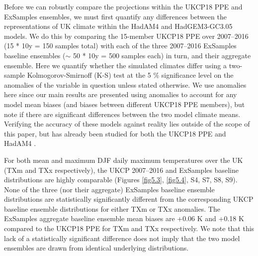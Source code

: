     Before we can robustly compare the projections within the UKCP18 PPE and ExSamples ensembles, we must first quantify any differences between the representations of UK climate within the HadAM4 and HadGEM3-GC3.05 models. We do this by comparing the 15-member UKCP18 PPE over 2007--2016 (15 * 10y = 150 samples total) with each of the three 2007--2016 ExSamples baseline ensembles ($\sim$ 50 * 10y = 500 samples each) in turn, and their aggregate ensemble. Here we quantify whether the simulated climates differ using a two-sample Kolmogorov-Smirnoff (K-S) test \citep{hodges_significance_1958,kolmogorov_sulla_1933,smirnoff_estimation_1939,smirnoff_sur_1939} at the 5 \% significance level on the anomalies of the variable in question unless stated otherwise. We use anomalies here since our main results are presented using anomalies to account for any model mean biases (and biases between different UKCP18 PPE members), but note if there are significant differences between the two model climate means. Verifying the accuracy of these models against reality lies outside of the scope of this paper, but has already been studied for both the UKCP18 PPE \citep{murphy_ukcp18_2018} and HadAM4 \citep{bevacqua_larger_2021,watson_multi-thousand_2020}.
    
    For both mean and maximum DJF daily maximum temperatures over the UK (TXm and TXx respectively), the UKCP 2007--2016 and ExSamples baseline distributions are highly comparable (Figures \ref{fig5.3}, \ref{fig5.4}, S4, S7, S8, S9). None of the three (nor their aggregate) ExSamples baseline ensemble distributions are statistically significantly different from the corresponding UKCP baseline ensemble distributions for either TXm or TXx anomalies. The ExSamples aggregate baseline ensemble mean biases are +0.06 K and +0.18 K compared to the UKCP18 PPE for TXm and TXx respectively. We note that this lack of a statistically significant difference does not imply that the two model ensembles are drawn from identical underlying distributions.
    
